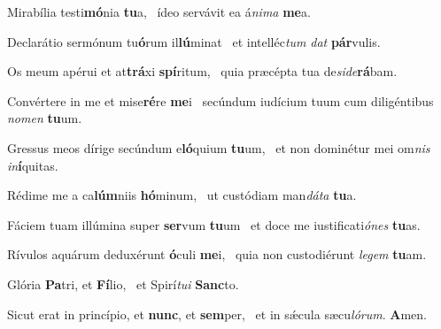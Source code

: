 \item Mirabília testi\textbf{mó}nia \textbf{tu}a,~\psstar{} ídeo servávit ea á\textit{nima} \textbf{me}a.

\item Declarátio sermónum tu\textbf{ó}rum il\textbf{lú}minat~\psstar{} et intelléc\textit{tum} \textit{dat} \textbf{pár}vulis.

\item Os meum apérui et at\textbf{trá}xi \textbf{spí}ritum,~\psstar{} quia præcépta tua de\textit{side}\textbf{rá}bam.

\item Convértere in me et mise\textbf{ré}re \textbf{me}i~\psstar{} secúndum iudícium tuum cum diligéntibus \textit{nomen} \textbf{tu}um.

\item Gressus meos dírige secúndum e\textbf{ló}quium \textbf{tu}um,~\psstar{} et non dominétur mei om\textit{nis} \textit{in}\textbf{í}quitas.

\item Rédime me a ca\textbf{lúm}niis \textbf{hó}minum,~\psstar{} ut custódiam man\textit{dáta} \textbf{tu}a.

\item Fáciem tuam illúmina super \textbf{ser}vum \textbf{tu}um~\psstar{} et doce me iustificati\textit{ónes} \textbf{tu}as.

\item Rívulos aquárum deduxérunt \textbf{ó}culi \textbf{me}i,~\psstar{} quia non custodiérunt \textit{legem} \textbf{tu}am.

\item Glória \textbf{Pa}tri, et \textbf{Fí}lio,~\psstar{} et Spirí\textit{tui} \textbf{Sanc}to.

\item Sicut erat in princípio, et \textbf{nunc}, et \textbf{sem}per,~\psstar{} et in sǽcula sæcu\textit{lórum}. \textbf{A}men.